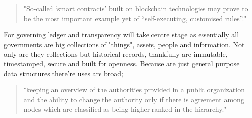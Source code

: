 \begin{quote}
	"So-called ‘smart contracts’ built on blockchain technologies may prove to be the most important example yet of “self-executing, customised rules”." \cite{MILLARD2018843}
\end{quote}

For governing  ledger and transparency will take centre stage as essentially all governments are big collections of "things", assets, people and information. Not only are they collections but historical records, thankfully  are immutable, timestamped, secure and built for openness. Because  are just general purpose data structures there're uses are broad; \begin{quote}"keeping an overview of the authorities provided in a public organization and the ability to change the authority only if there is agreement among nodes which are classified as being higher ranked in the hierarchy." \cite{OLNES2017355}\end{quote}


